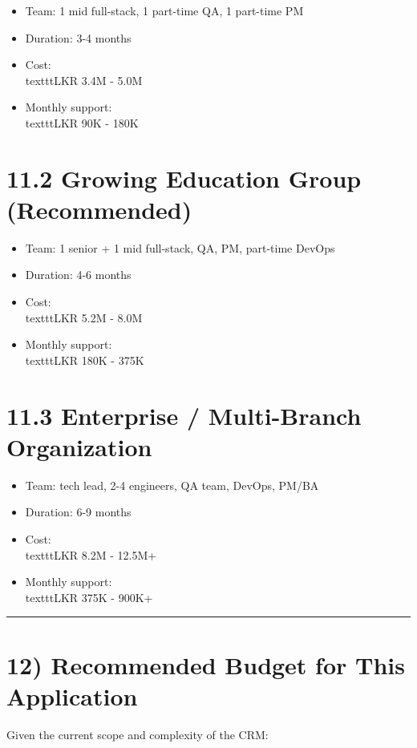 \documentclass[11pt,a4paper]{article}
\begin{document}
\begin{itemize}
\item Team: 1 mid full-stack, 1 part-time QA, 1 part-time PM
\item Duration: 3-4 months
\item Cost: \\texttt{LKR 3.4M - 5.0M}
\item Monthly support: \\texttt{LKR 90K - 180K}
\end{itemize}

\section{11.2 Growing Education Group (Recommended)}

\begin{itemize}
\item Team: 1 senior + 1 mid full-stack, QA, PM, part-time DevOps
\item Duration: 4-6 months
\item Cost: \\texttt{LKR 5.2M - 8.0M}
\item Monthly support: \\texttt{LKR 180K - 375K}
\end{itemize}

\section{11.3 Enterprise / Multi-Branch Organization}

\begin{itemize}
\item Team: tech lead, 2-4 engineers, QA team, DevOps, PM/BA
\item Duration: 6-9 months
\item Cost: \\texttt{LKR 8.2M - 12.5M+}
\item Monthly support: \\texttt{LKR 375K - 900K+}
\end{itemize}

\bigskip\hrule\bigskip

\section{12) Recommended Budget for This Application}

Given the current scope and complexity of the CRM:\\
\end{document}
